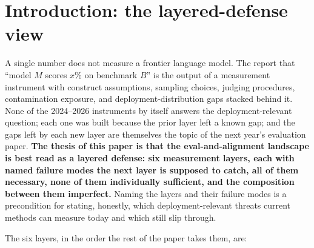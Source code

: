 
\section{Introduction: the layered-defense view}
\label{sec:introduction}

A single number does not measure a frontier language model. The
report that ``model $M$ scores $x\%$ on benchmark $B$'' is the
output of a measurement instrument with construct assumptions,
sampling choices, judging procedures, contamination exposure, and
deployment-distribution gaps stacked behind it. None of the
2024--2026 instruments by itself answers the deployment-relevant
question; each one was built because the prior layer left a known
gap; and the gaps left by each new layer are themselves the topic of
the next year's evaluation paper. \textbf{The thesis of this paper
is that the eval-and-alignment landscape is best read as a layered
defense: six measurement layers, each with named failure modes the
next layer is supposed to catch, all of them necessary, none of them
individually sufficient, and the composition between them
imperfect.} Naming the layers and their failure modes is a
precondition for stating, honestly, which deployment-relevant
threats current methods can measure today and which still slip
through.

The six layers, in the order the rest of the paper takes them, are:

